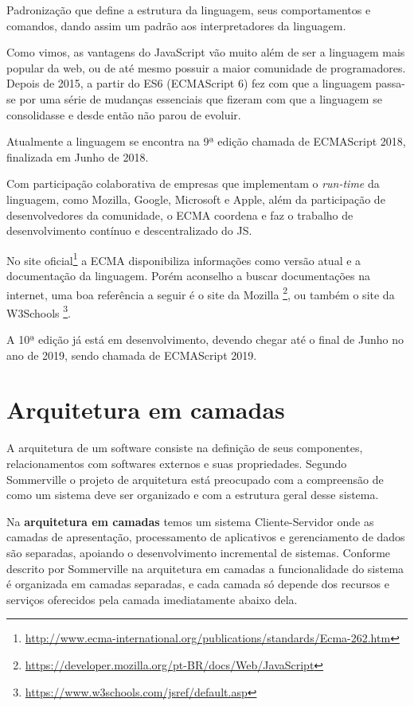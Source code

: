 \documentclass[
	12pt,				%
	openright,			%
	twoside,			%
	a4paper,			%
	english,			%
	brazil				%
	]{abntex2}
\begin{document}
Padronização que define a estrutura da linguagem, seus comportamentos e comandos, dando assim um padrão aos interpretadores da linguagem. 

Como vimos, as vantagens do JavaScript vão muito além de ser a linguagem mais popular da web, ou de até mesmo possuir a maior comunidade de programadores. Depois de 2015, a partir do ES6 (ECMAScript 6) fez com que a linguagem passa-se por uma série de mudanças essenciais que fizeram com que a linguagem se consolidasse e desde então não parou de evoluir.

Atualmente a linguagem se encontra na 9ª edição chamada de ECMAScript 2018, finalizada em Junho de 2018.

Com participação colaborativa de empresas que implementam o \textit{run-time} da linguagem, como Mozilla, Google, Microsoft e Apple, além da participação de desenvolvedores da comunidade, o ECMA coordena e faz o trabalho de desenvolvimento contínuo e descentralizado do JS.

No site oficial\footnote{\url{http://www.ecma-international.org/publications/standards/Ecma-262.htm}} a ECMA disponibiliza informações como versão atual e a documentação da linguagem. Porém aconselho a buscar documentações na internet, uma boa referência a seguir é o site da Mozilla \footnote{\url{https://developer.mozilla.org/pt-BR/docs/Web/JavaScript}}, ou também o site da W3Schools \footnote{\url{https://www.w3schools.com/jsref/default.asp}}. 

A 10ª edição já está em desenvolvimento, devendo chegar até o final de Junho no ano de 2019, sendo chamada de ECMAScript 2019.

\section{Arquitetura em camadas}
\label{sec:Arquitetura}


A arquitetura de um software consiste na definição de seus componentes, relacionamentos com softwares externos e suas propriedades. Segundo Sommerville\cite{sommerville_engenharia} o projeto de arquitetura está preocupado com a compreensão de como um sistema deve ser organizado e com a estrutura geral desse sistema.

Na \textbf{arquitetura em camadas} temos um sistema Cliente-Servidor onde as camadas de apresentação, processamento de aplicativos e gerenciamento de dados são separadas, apoiando o desenvolvimento incremental de sistemas. Conforme descrito por Sommerville\cite{sommerville_engenharia} na arquitetura em camadas a funcionalidade do sistema é organizada em camadas separadas, e cada camada só depende dos recursos e serviços oferecidos pela camada imediatamente abaixo dela.
\end{document}
